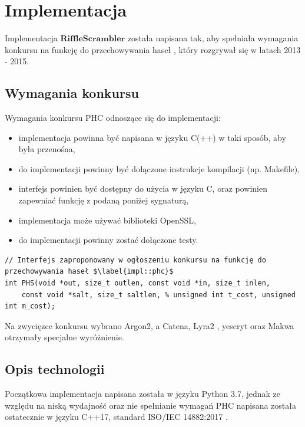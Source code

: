 \chapter{Implementacja}
\thispagestyle{chapterBeginStyle}

Implementacja $\mathbf{RiffleScrambler}$ została napisana tak, aby spełniała wymagania konkursu na funkcję do przechowywania haseł \cite[PHC, ang \textit{Password Hashing Competition}]{phc}, który rozgrywał się w latach 2013 - 2015.

\section{Wymagania konkursu}
Wymagania konkursu PHC odnoszące się do implementacji:
\begin{itemize}
	\item implementacja powinna być napisana w języku C(++) w taki sposób, aby była przenośna,
	\item do implementacji powinny być dołączone instrukcje kompilacji (np. Makefile),
	\item interfejs powinien być dostępny do użycia w języku C, oraz powinien zapewniać funkcję z podaną poniżej sygnaturą,
	\item implementacja może używać biblioteki OpenSSL,
	\item do implementacji powinny zostać dołączone testy.
\end{itemize}

\begin{verbatim}
// Interfejs zaproponowany w ogłoszeniu konkursu na funkcję do przechowywania haseł $\label{impl::phc}$
int PHS(void *out, size_t outlen, const void *in, size_t inlen,
	const void *salt, size_t saltlen, % unsigned int t_cost, unsigned int m_cost); 
\end{verbatim}

Na zwycięzce konkursu wybrano Argon2, a Catena, Lyra2 \cite{simplicio2015lyra2}, yescryt \cite{peslyak2014yescrypt} oraz Makwa \cite{pornin2015makwa} otrzymały specjalne wyróżnienie.

\section{Opis technologii}
Początkowa implementacja napisana została w języku Python 3.7, jednak ze względu na niską wydajność oraz nie spełnianie wymagań PHC napisana została ostatecznie w języku C++17, standard ISO/IEC 14882:2017 \cite{cpp17}.

